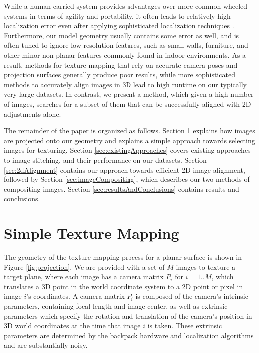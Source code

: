 \documentclass[]{spie}  %
\begin{document}
While a human-carried system provides advantages over more common
wheeled systems in terms of agility and portability, it often leads to
relatively high localization error even after applying sophisticated
localization techniques \cite{liu2010indoor}. Furthermore, our model
geometry usually contains some error as well, and is often tuned to
ignore low-resolution features, such as small walls, furniture, and
other minor non-planar features commonly found in indoor
environments. As a result, methods for texture mapping that rely on
accurate camera poses and projection surfaces generally produce poor
results, while more sophisticated methods to accurately align images
in 3D lead to high runtime on our typically very large datasets. In
contrast, we present a method, which given a high number of images,
searches for a subset of them that can be successfully aligned with 2D
adjustments alone.

The remainder of the paper is organized as follows. Section
\ref{sec:simpleTextureMapping} explains how images are projected onto
our geometry and explains a simple approach towards selecting images
for texturing. Section \ref{sec:existingApproaches} covers existing
approaches to image stitching, and their performance on our
datasets. Section \ref{sec:2dAlignment} contains our approach towards
efficient 2D image alignment, followed by Section
\ref{sec:imageCompositing}, which describes our two methods of
compositing images. Section \ref{sec:resultsAndConclusions} contains
results and conclusions.





\section{Simple Texture Mapping}
\label{sec:simpleTextureMapping}

The geometry of the texture mapping process for a planar surface is
shown in Figure \ref{fig:projection}.  We are provided with a set of
$M$ images to texture a target plane, where each image has a camera
matrix $P_i$ for $i=1..M$, which translates a 3D point in the world
coordinate system to a 2D point or pixel in image $i$'s coordinates. A
camera matrix $P_i$ is composed of the camera's intrinsic parameters,
containing focal length and image center, as well as extrinsic
parameters which specify the rotation and translation of the camera's
position in 3D world coordinates at the time that image $i$ is
taken. These extrinsic parameters are determined by the backpack
hardware and localization algorithms \cite{chen2010indoor,
  liu2010indoor, kua2012loopclosure} and are substantially noisy.
\end{document}
